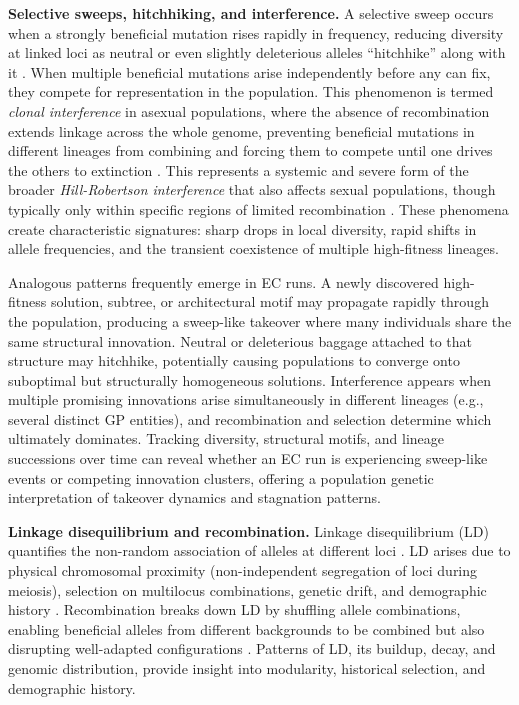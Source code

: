\textbf{Selective sweeps, hitchhiking, and interference.}
A selective sweep occurs when a strongly beneficial mutation rises rapidly in frequency, reducing diversity at linked loci as neutral or even slightly deleterious alleles ``hitchhike'' along with it \citep{hamilton2021population, barton2000genetic}.
When multiple beneficial mutations arise independently before any can fix, they compete for representation in the population.
This phenomenon is termed \emph{clonal interference} in asexual populations, where the absence of recombination extends linkage across the whole genome, preventing beneficial mutations in different lineages from combining and forcing them to compete until one drives the others to extinction \citep{gerrish1998fate}.
This represents a systemic and severe form of the broader \emph{Hill-Robertson interference} that also affects sexual populations, though typically only within specific regions of limited recombination \citep{hill1966effect}.
These phenomena create characteristic signatures: sharp drops in local diversity, rapid shifts in allele frequencies, and the transient coexistence of multiple high-fitness lineages.

Analogous patterns frequently emerge in EC runs.
A newly discovered high-fitness solution, subtree, or architectural motif may propagate rapidly through the population, producing a sweep-like takeover where many individuals share the same structural innovation.
Neutral or deleterious baggage attached to that structure may hitchhike, potentially causing populations to converge onto suboptimal but structurally homogeneous solutions.
Interference appears when multiple promising innovations arise simultaneously in different lineages (e.g., several distinct GP entities), and recombination and selection determine which ultimately dominates.
Tracking diversity, structural motifs, and lineage successions over time can reveal whether an EC run is experiencing sweep-like events or competing innovation clusters, offering a population genetic interpretation of takeover dynamics and stagnation patterns.

\textbf{Linkage disequilibrium and recombination.}
Linkage disequilibrium (LD) quantifies the non-random association of alleles at different loci \citep{hill1968linkage}.
LD arises due to physical chromosomal proximity (non-independent segregation of loci during meiosis), selection on multilocus combinations, genetic drift, and demographic history \citep{hamilton2021population}.
Recombination breaks down LD by shuffling allele combinations, enabling beneficial alleles from different backgrounds to be combined but also disrupting well-adapted configurations \citep{hamilton2021population, hill1968linkage}.
Patterns of LD, its buildup, decay, and genomic distribution, provide insight into modularity, historical selection, and demographic history.

